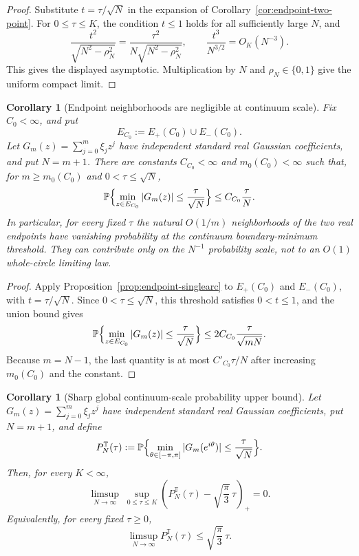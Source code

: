 \documentclass[11pt]{amsart}
\numberwithin{equation}{section}
\newtheorem{corollary}[theorem]{Corollary}
\theoremstyle{definition}
\theoremstyle{remark}
\newcommand{\T}{\mathbb T}
\newcommand{\Prob}{\mathbb P}
\begin{document}
\begin{proof}
Substitute \(t=\tau/\sqrt N\) in the expansion of
Corollary~\ref{cor:endpoint-two-point}.  For \(0\le\tau\le K\), the condition
\(t\le1\) holds for all sufficiently large \(N\), and
\[
  \frac{t^2}{\sqrt{N^2-\rho_N^2}}
  =\frac{\tau^2}{N\sqrt{N^2-\rho_N^2}},
  \qquad
  \frac{t^3}{N^{3/2}}=O_K(N^{-3}).
\]
This gives the displayed asymptotic.  Multiplication by \(N\) and
\(\rho_N\in\{0,1\}\) give the uniform compact limit.
\end{proof}

\begin{corollary}[Endpoint neighborhoods are negligible at continuum scale]
\label{cor:endpoint-neighborhood-continuum}
Fix \(C_0<\infty\), and put
\[
  E_{C_0}:=E_+(C_0)\cup E_-(C_0).
\]
Let \(G_m(z)=\sum_{j=0}^m\xi_jz^j\) have independent standard real Gaussian
coefficients, and put \(N=m+1\).  There are constants
\(C_{C_0}<\infty\) and \(m_0(C_0)<\infty\) such that, for
\(m\ge m_0(C_0)\) and \(0<\tau\le \sqrt N\),
\[
  \Prob\Bigl\{
    \min_{z\in E_{C_0}} |G_m(z)|\le \frac{\tau}{\sqrt N}
  \Bigr\}
  \le C_{C_0}\frac{\tau}{N}.
\]
In particular, for every fixed \(\tau\) the natural \(O(1/m)\) neighborhoods
of the two real endpoints have vanishing probability at the continuum
boundary-minimum threshold.  They can contribute only on the \(N^{-1}\)
probability scale, not to an \(O(1)\) whole-circle limiting law.
\end{corollary}

\begin{proof}
Apply Proposition~\ref{prop:endpoint-singlearc} to \(E_+(C_0)\) and
\(E_-(C_0)\), with \(t=\tau/\sqrt N\).  Since \(0<\tau\le\sqrt N\), this
threshold satisfies \(0<t\le1\), and the union bound gives
\[
  \Prob\Bigl\{\min_{z\in E_{C_0}} |G_m(z)|\le \frac{\tau}{\sqrt N}\Bigr\}
  \le 2C_{C_0}\frac{\tau}{\sqrt{mN}}.
\]
Because \(m=N-1\), the last quantity is at most \(C'_{C_0}\tau/N\) after
increasing \(m_0(C_0)\) and the constant.
\end{proof}

\begin{corollary}[Sharp global continuum-scale probability upper bound]
\label{cor:global-prob-upper}
Let \(G_m(z)=\sum_{j=0}^m\xi_jz^j\) have independent standard real Gaussian
coefficients, put \(N=m+1\), and define
\[
  P_N^{\T}(\tau):=
  \Prob\Bigl\{
    \min_{\theta\in[-\pi,\pi]} |G_m(e^{i\theta})|
    \le \frac{\tau}{\sqrt N}
  \Bigr\}.
\]
Then, for every \(K<\infty\),
\[
  \limsup_{N\to\infty}\;
  \sup_{0\le\tau\le K}
  \left(
    P_N^{\T}(\tau)-\sqrt{\frac{\pi}{3}}\,\tau
  \right)_+
  =0 .
\]
Equivalently, for every fixed \(\tau\ge0\),
\[
  \limsup_{N\to\infty} P_N^{\T}(\tau)
  \le \sqrt{\frac{\pi}{3}}\,\tau .
\]
\end{corollary}
\end{document}

